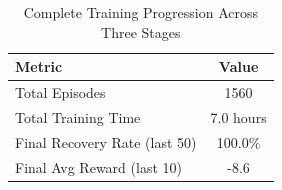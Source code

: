 \begin{table}[htbp]
\centering
\caption{Complete Training Progression Across Three Stages}
\label{tab:training_progression}
\begin{tabular}{lc}
\toprule
\textbf{Metric} & \textbf{Value} \\
\midrule
Total Episodes & 1560 \\
Total Training Time & 7.0 hours \\
Final Recovery Rate (last 50) & 100.0\% \\
Final Avg Reward (last 10) & -8.6 \\
\bottomrule
\end{tabular}
\end{table}
